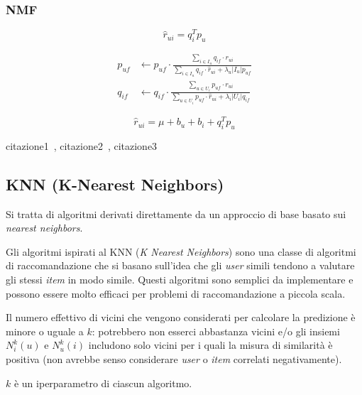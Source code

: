 \subsubsection{NMF}

\[
\hat{r}_{ui} = q_i^Tp_u
\] 

\begin{equation}
    \begin{split}
    p_{uf} &\leftarrow p_{uf} \cdot \frac{\sum_{i \in I_u} q_{if} \cdot r_{ui}}
    {\sum_{i \in I_u} q_{if} \cdot \hat{r}_{ui} + \lambda_u |I_u| p_{uf}} \\
    q_{if} &\leftarrow q_{if} \cdot \frac{\sum_{u \in U_i} p_{uf} \cdot r_{ui}}
    {\sum_{u \in U_i} p_{uf} \cdot \hat{r}_{ui} + \lambda_i |U_i| q_{if}}
    \end{split}
\end{equation}
    

\[
\hat{r}_{ui} = \mu + b_u + b_i + q_i^Tp_u
\]

citazione1~\cite{NMF}, citazione2~\cite{NMF2}, citazione3~\cite{NMF3}


\subsection{KNN (K-Nearest Neighbors)}\label{knn}
Si tratta di algoritmi derivati direttamente da un approccio di base basato sui \textit{nearest neighbors}.

Gli algoritmi ispirati al KNN (\textit{K Nearest Neighbors}) sono una classe di algoritmi di raccomandazione che si basano sull'idea che gli \textit{user} simili tendono a valutare gli stessi \textit{item} in modo simile. Questi algoritmi sono semplici da implementare e possono essere molto efficaci per problemi di raccomandazione a piccola scala.

Il numero effettivo di vicini che vengono considerati per calcolare la predizione è minore o uguale a $k$: potrebbero non esserci abbastanza vicini e/o gli insiemi $N_i^k(u)$ e $N_u^k(i)$ includono solo vicini per i quali la misura di similarità è positiva (non avrebbe senso considerare \textit{user} o \textit{item} correlati negativamente).

$k$ è un iperparametro di ciascun algoritmo.


